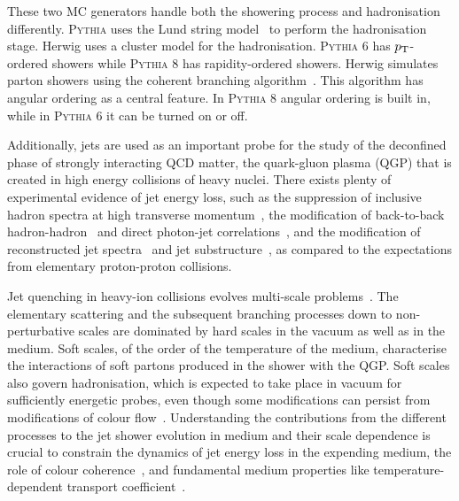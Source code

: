These two MC generators handle both the showering process and hadronisation differently. \textsc{Pythia} uses the Lund string model~\cite{lundString} to perform the hadronisation stage. Herwig uses a cluster model for the hadronisation. \textsc{Pythia} 6 has $p_{\rm T}$-ordered showers while \textsc{Pythia} 8 has rapidity-ordered showers. Herwig simulates parton showers using the coherent branching algorithm~\cite{Gieseke:2003rz}. This algorithm has angular ordering as a central feature. In \textsc{Pythia} 8 angular ordering is built in, while in \textsc{Pythia} 6 it can be turned on or off.

Additionally, jets are used as an important probe for the study of the deconfined phase of strongly interacting QCD matter, the quark-gluon plasma (QGP) that is created in high energy collisions of heavy nuclei.
There exists plenty of experimental evidence of jet energy loss, such as the suppression of inclusive hadron spectra at high transverse momentum~\cite{Adcox:2001jp,Adams:2003im,Arsene:2003yk,Khachatryan:2016odn,Acharya:2018qsh}, the modification of back-to-back hadron-hadron~\cite{Adare:2007vu,Aamodt:2011vg} and direct photon-jet correlations~\cite{Adare:2012qi}, and the modification of reconstructed jet spectra~\cite{Adam:2015ewa} and jet substructure~\cite{Sirunyan:2018qec,Chatrchyan:2014ava,Acharya:2018uvf}, as compared to the expectations from elementary proton-proton collisions.

Jet quenching in heavy-ion collisions evolves multi-scale problems~\cite{Kurkela:2014tla,Tachibana:2018yae}. The elementary scattering and the subsequent branching processes down to non-perturbative scales are dominated by hard scales in the vacuum as well as in the medium. Soft scales, of the order of the temperature of the medium, characterise the interactions of soft partons produced in the shower with the QGP. Soft scales also govern hadronisation, which is expected to take place in vacuum for sufficiently energetic probes, even though some modifications can persist from modifications of colour flow~\cite{Aurenche:2011rd,Beraudo:2011bh,Beraudo:2012bq}. Understanding the contributions from the different processes to the jet shower evolution in medium and their scale dependence is crucial to constrain the dynamics of jet energy loss in the expending medium, the role of colour coherence~\cite{CasalderreySolana:2012ef}, and fundamental medium properties like temperature-dependent transport coefficient~\cite{DEramo:2012uzl,Ayala:2016pvm}.

